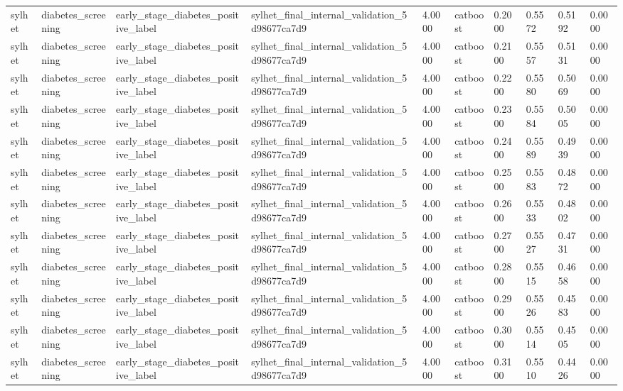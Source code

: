 \begin{tabular}{llllllllll}
sylhet & diabetes\_screening & early\_stage\_diabetes\_positive\_label & sylhet\_final\_internal\_validation\_5d98677ca7d9 & 4.0000 & catboost & 0.2000 & 0.5572 & 0.5192 & 0.0000 \\
sylhet & diabetes\_screening & early\_stage\_diabetes\_positive\_label & sylhet\_final\_internal\_validation\_5d98677ca7d9 & 4.0000 & catboost & 0.2100 & 0.5557 & 0.5131 & 0.0000 \\
sylhet & diabetes\_screening & early\_stage\_diabetes\_positive\_label & sylhet\_final\_internal\_validation\_5d98677ca7d9 & 4.0000 & catboost & 0.2200 & 0.5580 & 0.5069 & 0.0000 \\
sylhet & diabetes\_screening & early\_stage\_diabetes\_positive\_label & sylhet\_final\_internal\_validation\_5d98677ca7d9 & 4.0000 & catboost & 0.2300 & 0.5584 & 0.5005 & 0.0000 \\
sylhet & diabetes\_screening & early\_stage\_diabetes\_positive\_label & sylhet\_final\_internal\_validation\_5d98677ca7d9 & 4.0000 & catboost & 0.2400 & 0.5589 & 0.4939 & 0.0000 \\
sylhet & diabetes\_screening & early\_stage\_diabetes\_positive\_label & sylhet\_final\_internal\_validation\_5d98677ca7d9 & 4.0000 & catboost & 0.2500 & 0.5583 & 0.4872 & 0.0000 \\
sylhet & diabetes\_screening & early\_stage\_diabetes\_positive\_label & sylhet\_final\_internal\_validation\_5d98677ca7d9 & 4.0000 & catboost & 0.2600 & 0.5533 & 0.4802 & 0.0000 \\
sylhet & diabetes\_screening & early\_stage\_diabetes\_positive\_label & sylhet\_final\_internal\_validation\_5d98677ca7d9 & 4.0000 & catboost & 0.2700 & 0.5527 & 0.4731 & 0.0000 \\
sylhet & diabetes\_screening & early\_stage\_diabetes\_positive\_label & sylhet\_final\_internal\_validation\_5d98677ca7d9 & 4.0000 & catboost & 0.2800 & 0.5515 & 0.4658 & 0.0000 \\
sylhet & diabetes\_screening & early\_stage\_diabetes\_positive\_label & sylhet\_final\_internal\_validation\_5d98677ca7d9 & 4.0000 & catboost & 0.2900 & 0.5526 & 0.4583 & 0.0000 \\
sylhet & diabetes\_screening & early\_stage\_diabetes\_positive\_label & sylhet\_final\_internal\_validation\_5d98677ca7d9 & 4.0000 & catboost & 0.3000 & 0.5514 & 0.4505 & 0.0000 \\
sylhet & diabetes\_screening & early\_stage\_diabetes\_positive\_label & sylhet\_final\_internal\_validation\_5d98677ca7d9 & 4.0000 & catboost & 0.3100 & 0.5510 & 0.4426 & 0.0000 \\

\end{tabular}
